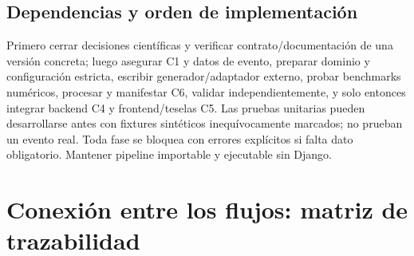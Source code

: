 \documentclass[11pt,a4paper]{article}
\begin{document}
\subsection{Dependencias y orden de implementación}
Primero cerrar decisiones científicas y verificar contrato/documentación de una versión concreta; luego asegurar C1 y datos de evento, preparar dominio y configuración estricta, escribir generador/adaptador externo, probar benchmarks numéricos, procesar y manifestar C6, validar independientemente, y solo entonces integrar backend C4 y frontend/teselas C5. Las pruebas unitarias pueden desarrollarse antes con fixtures sintéticos inequívocamente marcados; no prueban un evento real. Toda fase se bloquea con errores explícitos si falta dato obligatorio. Mantener pipeline importable y ejecutable sin Django.

\section{Conexión entre los flujos: matriz de trazabilidad}
\end{document}
